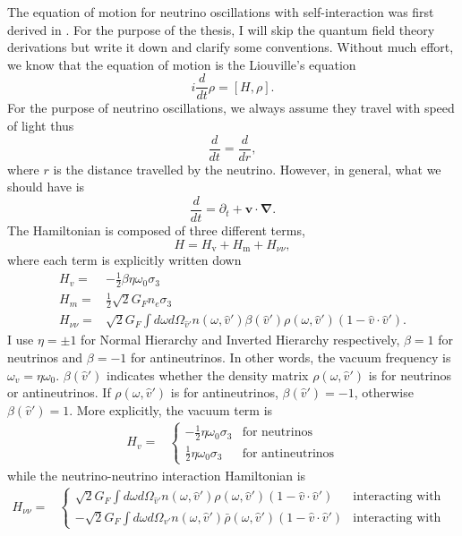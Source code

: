 The equation of motion for neutrino oscillations with self-interaction was first derived in \cite{Sigl1993}. For the purpose of the thesis, I will skip the quantum field theory derivations but write it down and clarify some conventions. Without much effort, we know that the equation of motion is the Liouville's equation
\begin{equation}
   i \frac{d}{dt}\rho = [H,\rho]. 
\end{equation}
For the purpose of neutrino oscillations, we always assume they travel with speed of light thus
\begin{equation}
   \frac{d}{dt} = \frac{d}{dr}, 
\end{equation}
where $r$ is the distance travelled by the neutrino. However, in general, what we should have is
\begin{equation}
   \frac{d}{dt} = \partial_t + \mathbf v\cdot \boldsymbol{\nabla}. 
\end{equation}
The Hamiltonian is composed of three different terms,
\begin{equation}
   H = H_{\mathrm v} + H_{\mathrm m} + H_{\nu\nu}, 
\end{equation}
where each term is explicitly written down
\begin{align}
   H_v =& -\frac{1}{2}\beta\eta \omega_0 \sigma_3\\
   H_m =& \frac{1}{2} \sqrt{2}G_F n_e \sigma_3 \\
   H_{\nu\nu} =& \sqrt{2}G_F \int d\omega d\Omega_{\hat v'} n(\omega,\hat v')\beta(\hat v')\rho(\omega,\hat v') (1-\hat v \cdot \hat v').
\end{align}
I use $\eta=\pm 1$ for Normal Hierarchy and Inverted Hierarchy respectively, $\beta=1$ for neutrinos and $\beta=-1$ for antineutrinos. In other words, the vacuum frequency is $\omega_v = \eta \omega_0$. $\beta(\hat v')$ indicates whether the density matrix $\rho(\omega,\hat v')$ is for neutrinos or antineutrinos. If $\rho(\omega,\hat v')$ is for antineutrinos, $\beta(\hat v')=-1$, otherwise $\beta(\hat v')=1$. More explicitly, the vacuum term is
\begin{align*}
   H_v =& \begin{cases}
   -\frac{1}{2}\eta \omega_0 \sigma_3 & \text{for neutrinos}\\
   \frac{1}{2}\eta \omega_0 \sigma_3 & \text{for antineutrinos}
   \end{cases}
\end{align*}
while the neutrino-neutrino interaction Hamiltonian is
\begin{align*}
   H_{\nu\nu} =& \begin{cases}
   \sqrt{2}G_F \int d\omega d\Omega_{\hat v'} n(\omega,\hat v')\rho(\omega,\hat v') (1-\hat v \cdot \hat v') & \text{interacting with neutrinos} \\
   - \sqrt{2}G_F \int d\omega d\Omega_{\hat v'} n(\omega,\hat v')\bar\rho(\omega,\hat v') (1-\hat v \cdot \hat v') &  \text{interacting with antineutrinos}
   \end{cases}
\end{align*}
